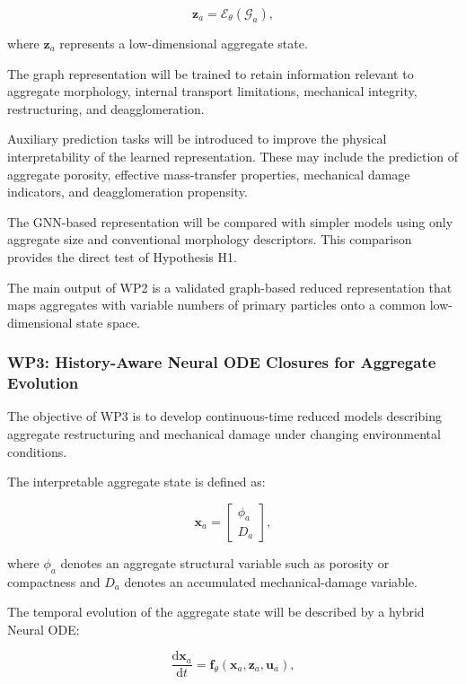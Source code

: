 \documentclass[11pt,a4paper,twoside]{scrartcl}
\begin{document}
\begin{equation}
	\mathbf{z}_a
	=
	\mathcal{E}_{\theta}
	\left(
	\mathcal{G}_a
	\right),
\end{equation}

where $\mathbf{z}_a$ represents a low-dimensional aggregate state.

The graph representation will be trained to retain information relevant to aggregate morphology, internal transport limitations, mechanical integrity, restructuring, and deagglomeration.

Auxiliary prediction tasks will be introduced to improve the physical interpretability of the learned representation. These may include the prediction of aggregate porosity, effective mass-transfer properties, mechanical damage indicators, and deagglomeration propensity.

The GNN-based representation will be compared with simpler models using only aggregate size and conventional morphology descriptors. This comparison provides the direct test of Hypothesis H1.

The main output of WP2 is a validated graph-based reduced representation that maps aggregates with variable numbers of primary particles onto a common low-dimensional state space.


\subsubsection{WP3: History-Aware Neural ODE Closures for Aggregate Evolution}

The objective of WP3 is to develop continuous-time reduced models describing aggregate restructuring and mechanical damage under changing environmental conditions.

The interpretable aggregate state is defined as:

\begin{equation}
	\mathbf{x}_a
	=
	\begin{bmatrix}
		\phi_a \\
		D_a
	\end{bmatrix},
\end{equation}

where $\phi_a$ denotes an aggregate structural variable such as porosity or compactness and $D_a$ denotes an accumulated mechanical-damage variable.

The temporal evolution of the aggregate state will be described by a hybrid Neural ODE:

\begin{equation}
	\frac{\mathrm{d}\mathbf{x}_a}{\mathrm{d}t}
	=
	\mathbf{f}_{\theta}
	\left(
	\mathbf{x}_a,
	\mathbf{z}_a,
	\mathbf{u}_a
	\right),
\end{equation}
\end{document}
